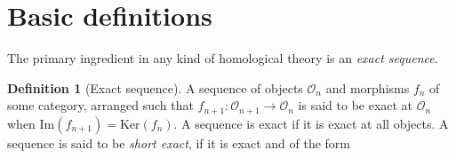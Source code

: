 \documentclass[aps,pra,showpacs,notitlepage,onecolumn,superscriptaddress,nofootinbib]{revtex4-1}
\theoremstyle{definition}
\newtheorem{definition}{Definition}[section]
\begin{document}
\section{Basic definitions}

\noindent The primary ingredient in any kind of homological theory is an \emph{exact sequence}.

\begin{definition}[Exact sequence]
  A sequence of objects $\mathcal{O}_n$ and morphisms $f_n$ of some category, arranged such that
  $f_{n + 1} : \mathcal{O}_{n + 1} \rightarrow \mathcal{O}_{n}$ is said to be exact at $\mathcal{O}_n$
  when $\text{Im}(f_{n + 1}) = \text{Ker}(f_n)$. A sequence is exact if it is exact at all objects. A sequence
  is said to be \emph{short exact}, if it is exact and of the form
  \begin{equation}

    \end{equation}
  \end{definition}
\end{document}
